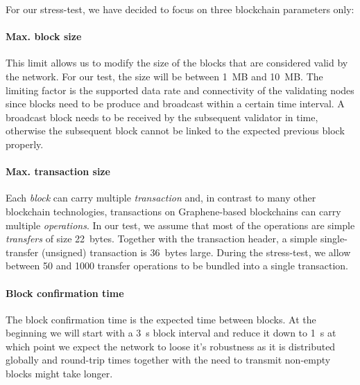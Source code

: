 For our stress-test, we have decided to focus on three blockchain parameters only:

\paragraph{Max. block size}
This limit allows us to modify the size of the blocks that are considered valid
by the network. For our test, the size will be between \SI{1}{MB} and
\SI{10}{MB}. The limiting factor is the supported data rate and connectivity of
the validating nodes since blocks need to be produce and broadcast within a
certain time interval. A broadcast block needs to be received by the subsequent
validator in time, otherwise the subsequent block cannot be linked to the
expected previous block properly.

\paragraph{Max. transaction size}
Each \emph{block} can carry multiple \emph{transaction} and, in contrast to
many other blockchain technologies, transactions on Graphene-based blockchains
can carry multiple \emph{operations}. In our test, we assume that most of the
operations are simple \emph{transfers} of size \SI{22}{bytes}. Together with
the transaction header, a simple single-transfer (unsigned) transaction is
\SI{36}{bytes} large. During the stress-test, we allow between \num{50} and
\num{1000} transfer operations to be bundled into a single transaction.

\paragraph{Block confirmation time}
The block confirmation time is the expected time between blocks. At the
beginning we will start with a \SI{3}{s} block interval and reduce it down to
\SI{1}{s} at which point we expect the network to loose it's robustness as it
is distributed globally and round-trip times together with the need to transmit
non-empty blocks might take longer.
